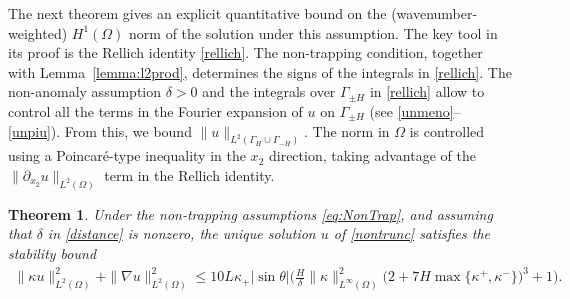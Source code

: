 \documentclass[10pt,a4paper]{amsart}
\newtheorem{thm}{Theorem}
\newcommand{\GH}{{\Gamma_H}}
\newcommand{\GmH}{{\Gamma_{-H}}}
\newcommand{\GpmH}{{\Gamma_{\pm H}}}
\begin{document}
The next theorem gives an explicit quantitative bound on the (wavenumber-weighted) $H^1(\Omega)$ norm of the solution under this assumption.
The key tool in its proof is the Rellich identity \eqref{rellich}.
The non-trapping condition, together with Lemma~\ref{lemma:l2prod}, determines the signs of the integrals in \eqref{rellich}.
The non-anomaly assumption $\delta>0$ and the integrals over $\GpmH$ in \eqref{rellich} allow to control all the terms in the Fourier expansion of $u$ on $\GpmH$ (see \eqref{unmeno}--\eqref{unpiu}).
From this, we bound $\|u\|_{L^2(\GH\cup\GmH)}$.
The norm in $\Omega$ is controlled using a Poincaré-type inequality in the $x_2$ direction, taking advantage of the $\|\partial_{x_2}u\|_{L^2(\Omega)}$ term in the Rellich identity.



\begin{thm} \label{thm-stima}
Under the non-trapping assumptions \eqref{eq:NonTrap}, and assuming that $\delta$ in \eqref{distance} is nonzero,  the unique solution $u$ of \eqref{nontrunc} satisfies the stability bound
\begin{align}\label{stimaH1} 
	\|\kappa u\|_{L^2(\Omega)}^2 + \|\nabla u\|_{L^2(\Omega)}^2
	\le 10L\kappa_+|\sin\theta|\bigg(\frac H\delta\|\kappa\|_{L^\infty(\Omega)}^2
	\big(2+7H\max\{\kappa^+,\kappa^-\}\big)^3+1\bigg).
\end{align}
\end{thm}
\end{document}
